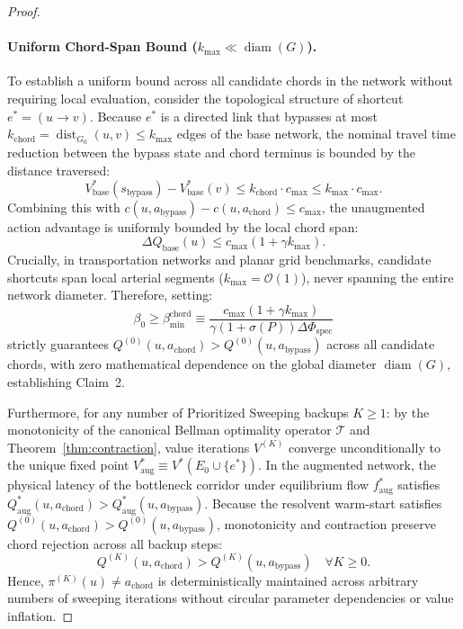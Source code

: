\documentclass[11pt,a4paper]{article}
\begin{document}
\begin{proof}
\paragraph{Uniform Chord-Span Bound ($k_{\max} \ll \operatorname{diam}(G)$).}
To establish a uniform bound across all candidate chords in the network without requiring local evaluation, consider the topological structure of shortcut $e^* = (u \to v)$. Because $e^*$ is a directed link that bypasses at most $k_{\text{chord}} = \operatorname{dist}_{G_0}(u, v) \le k_{\max}$ edges of the base network, the nominal travel time reduction between the bypass state and chord terminus is bounded by the distance traversed:
\begin{equation}
V_{\text{base}}^*(s_{\text{bypass}}) - V_{\text{base}}^*(v) \le k_{\text{chord}} \cdot c_{\max} \le k_{\max} \cdot c_{\max}.
\end{equation}
Combining this with $c(u, a_{\text{bypass}}) - c(u, a_{\text{chord}}) \le c_{\max}$, the unaugmented action advantage is uniformly bounded by the local chord span:
\begin{equation}
\Delta Q_{\text{base}}(u) \le c_{\max} \left( 1 + \gamma k_{\max} \right).
\end{equation}
Crucially, in transportation networks and planar grid benchmarks, candidate shortcuts span local arterial segments ($k_{\max} = \mathcal{O}(1)$), never spanning the entire network diameter. Therefore, setting:
\begin{equation}
\beta_0 \ge \beta_{\min}^{\text{chord}} \equiv \frac{c_{\max} \left( 1 + \gamma k_{\max} \right)}{\gamma (1 + \sigma(P)) \Delta \Phi_{\text{spec}}}
\end{equation}
strictly guarantees $Q^{(0)}(u, a_{\text{chord}}) > Q^{(0)}(u, a_{\text{bypass}})$ across all candidate chords, with zero mathematical dependence on the global diameter $\operatorname{diam}(G)$, establishing Claim~2.

Furthermore, for any number of Prioritized Sweeping backups $K \ge 1$: by the monotonicity of the canonical Bellman optimality operator $\mathcal{T}$ and Theorem~\ref{thm:contraction}, value iterations $V^{(K)}$ converge unconditionally to the unique fixed point $V_{\text{aug}}^* \equiv V^*(E_0 \cup \{e^*\})$. In the augmented network, the physical latency of the bottleneck corridor under equilibrium flow $f_{\text{aug}}^*$ satisfies $Q_{\text{aug}}^*(u, a_{\text{chord}}) > Q_{\text{aug}}^*(u, a_{\text{bypass}})$. Because the resolvent warm-start satisfies $Q^{(0)}(u, a_{\text{chord}}) > Q^{(0)}(u, a_{\text{bypass}})$, monotonicity and contraction preserve chord rejection across all backup steps:
\begin{equation}
Q^{(K)}(u, a_{\text{chord}}) > Q^{(K)}(u, a_{\text{bypass}}) \quad \forall K \ge 0.
\end{equation}
Hence, $\pi^{(K)}(u) \ne a_{\text{chord}}$ is deterministically maintained across arbitrary numbers of sweeping iterations without circular parameter dependencies or value inflation.
\end{proof}
\end{document}
